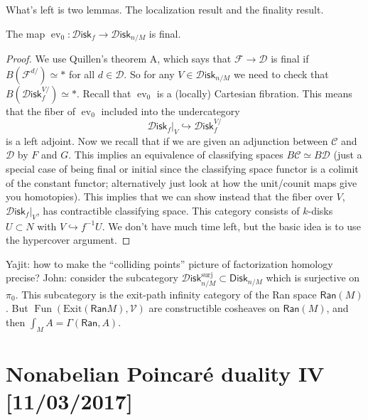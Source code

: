 \documentclass{amsart}
\DeclareMathOperator{\Fun}{Fun}
\DeclareMathOperator{\ev}{ev}
\begin{document}
What's left is two lemmas. The localization result and the finality result.

\begin{lemma}
    The map $\ev_0:\mathcal{D}\mathsf{isk}_f \to \mathcal{D}\mathsf{isk}_{n/M}$ is final.
\end{lemma}
\begin{proof}
    We use Quillen's theorem A, which says that $\mathcal{F}\to \mathcal{D}$ is final if
    $B(\mathcal{F}^{d/})\simeq *$ for all $d\in \mathcal{D}$. So for any $V\in\mathcal{D}\mathsf{isk}_{n/M}$
    we need to check that $B(\mathcal{D}\mathsf{isk}_f^{V/})\simeq *$. Recall that $\ev_0$
    is a (locally) Cartesian fibration. This means that the fiber of $\ev_0$ included into
    the undercategory
    \begin{equation*}
        \mathcal{D}\mathsf{isk}_f|_{V}\hookrightarrow \mathcal{D}\mathsf{isk}_f^{V/}
    \end{equation*}
    is a left adjoint.
    Now we recall that if we are given an adjunction between $\mathcal{C}$ and $\mathcal{D}$ by $F$ and $G$.
    This implies an equivalence of classifying spaces $B\mathcal{C}\simeq B\mathcal{D}$ (just
    a special case of being final or initial since the classifying space functor is a colimit
    of the constant functor; alternatively just look at how the unit/counit maps give you homotopies).
    This implies that we can show instead that the fiber over $V$, $\mathcal{D}\mathsf{isk}_f|_{V}$, has
    contractible classifying space. This category consists of $k$-disks $U\subset N$ with
    $V\hookrightarrow f^{-1}U$. We don't have much time left, but the basic idea is to use the
    hypercover argument.
\end{proof}

Yajit: how to make the ``colliding points'' picture of factorization homology precise?
John: consider the subcategory $\mathcal{D}\mathsf{isk}_{n/M}^\text{surj}\subset \mathsf{Disk}_{n/M}$
which is surjective on $\pi_0$. This subcategory is the exit-path infinity category of the Ran
space $\mathsf{Ran}(M)$. But $\Fun(\text{Exit}(\mathsf{Ran} M), \mathcal{V})$ are constructible
cosheaves on $\mathsf{Ran}(M)$, and then $\int_M A=\Gamma(\mathsf{Ran}, A)$.


\newpage

\section{Nonabelian Poincar\'e duality IV [11/03/2017]}
\end{document}
